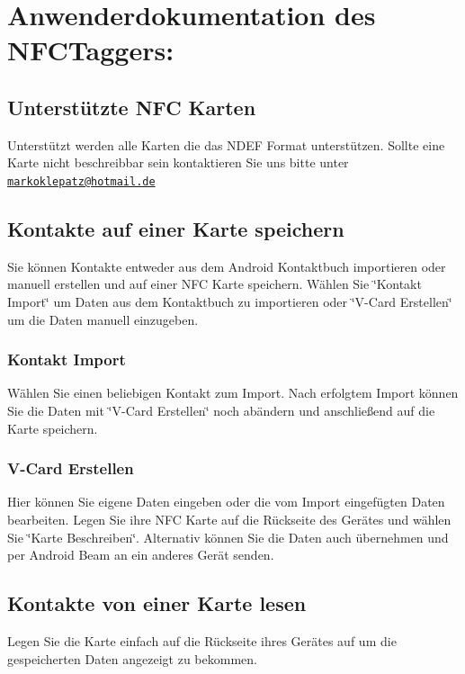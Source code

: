 \documentclass[a4paper,ngerman,12pt]{report}
\begin{document}
\chapter{Anwenderdokumentation des NFCTaggers:}
\section{Unterstützte NFC Karten}

Unterstützt werden alle Karten die das NDEF Format unterstützen. Sollte eine Karte nicht beschreibbar sein kontaktieren Sie uns bitte unter \href{mailto:markoklepatz@hotmail.de}{\tt markoklepatz@hotmail.de}

\section{Kontakte auf einer Karte speichern}

Sie können Kontakte entweder aus dem Android Kontaktbuch importieren oder manuell erstellen und auf einer NFC Karte speichern. Wählen Sie \char`\"{}Kontakt Import\char`\"{} um Daten aus dem Kontaktbuch zu importieren oder \char`\"{}V-Card Erstellen\char`\"{} um die Daten manuell einzugeben.

\subsection{Kontakt Import}

Wählen Sie einen beliebigen Kontakt zum Import. Nach erfolgtem Import können Sie die Daten mit \char`\"{}V-Card Erstellen\char`\"{} noch abändern und anschließend auf die Karte speichern.

\subsection{V-Card Erstellen}

Hier können Sie eigene Daten eingeben oder die vom Import eingefügten Daten bearbeiten. Legen Sie ihre NFC Karte auf die Rückseite des Gerätes und wählen Sie \char`\"{}Karte Beschreiben\char`\"{}. Alternativ können Sie die Daten auch übernehmen und per Android Beam an ein anderes Gerät senden.

\section{Kontakte von einer Karte lesen}

Legen Sie die Karte einfach auf die Rückseite ihres Gerätes auf um die gespeicherten Daten angezeigt zu bekommen. 
\end{document}
